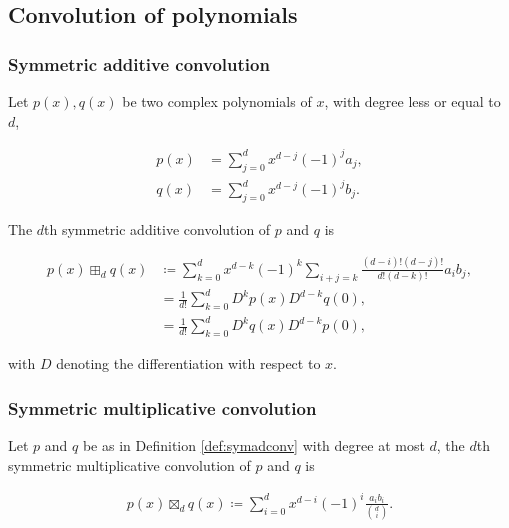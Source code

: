 
\subsection{Convolution of polynomials}

\subsubsection{Symmetric additive convolution}

\begin{definition}\label{def:symadconv}
    Let $p(x), q(x)$ be two complex polynomials of $x$, with degree less or equal to $d$,

    \begin{align*}
        p(x) &= \sum_{j=0}^d x^{d-j}(-1)^{j}a_j,\\
        q(x) &= \sum_{j=0}^d x^{d-j}(-1)^{j}b_j.
    \end{align*}

    The $d$th symmetric additive convolution of $p$ and $q$ is

    \begin{align*}
        p(x) \boxplus_d q(x) &\coloneqq \sum_{k=0}^d x^{d-k}(-1)^k \sum_{i+j = k} \frac{(d-i)!(d-j)!}{d!(d-k)!}a_i b_j, \\
        &= \frac{1}{d!}\sum_{k=0}^d D^k p(x)D^{d-k}q(0),\\
        &= \frac{1}{d!}\sum_{k=0}^d D^k q(x)D^{d-k}p(0),
    \end{align*}

    \noindent with $D$ denoting the differentiation with respect to $x$.
\end{definition}



\subsubsection{Symmetric multiplicative convolution}

\begin{definition}
    Let $p$ and $q$ be as in Definition \ref{def:symadconv} with degree at most $d$, the $d$th symmetric multiplicative convolution of $p$ and $q$ is 

    \begin{align*}
        p(x) \boxtimes_d q(x) \coloneqq \sum_{i=0}^d x^{d-i}(-1)^i\frac{a_ib_i}{\binom di}.
    \end{align*}
\end{definition}


